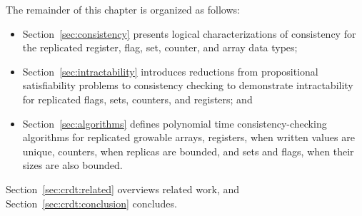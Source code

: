 The remainder of this chapter is organized as follows:
\begin{itemize}

  \item Section~\ref{sec:consistency} presents logical characterizations of consistency for the replicated register, flag, set, counter, and array data types;

  \item Section~\ref{sec:intractability} introduces reductions from propositional satisfiability problems to consistency checking to demonstrate intractability for replicated flags, sets, counters, and registers; and

  \item Section~\ref{sec:algorithms} defines polynomial time consistency-checking algorithms for replicated growable arrays, registers, when written values are unique, counters, when replicas are bounded, and sets and flags, when their sizes are also bounded.

\end{itemize}
Section~\ref{sec:crdt:related} overviews related work, and Section~\ref{sec:crdt:conclusion} concludes.
